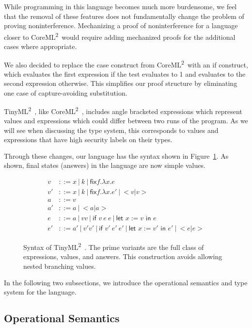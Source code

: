 \documentclass[a4paper,twocolumn]{article}
\newcommand{\langName}[0]{TinyML\textsuperscript{2}~}
\newcommand{\origLang}[0]{CoreML\textsuperscript{2}~}
\theoremstyle{plain}
\theoremstyle{definition}
\begin{document}
While programming in this language becomes much more burdensome, we
feel that the removal of these features does not fundamentally 
change the problem of proving
noninterference.  Mechanizing a proof of noninterference for a
language closer to \origLang would require adding mechanized proofs
for the additional cases where appropriate.

We also decided to replace the
\textsf{case} construct from \origLang with an \textsf{if} construct, which
evaluates the first expression if the test evaluates to 1 and evaluates to the
second expression otherwise.  This simplifies our proof structure by eliminating
one case of capture-avoiding substitution.

\langName, like \origLang, includes angle bracketed expressions which represent
values and expressions which could differ between two runs of the program.  As we
will see when discussing the type system, this corresponds to values and
expressions that have high security labels on their types.

Through these changes, our language has the syntax shown in
Figure~\ref{fig:syntax}.  As shown, final states (answers) in the language are
now simple values.

\begin{figure}[t]
  \begin{align}
    v & ::= x \: | \: k \: | \: \textsf{fix} f . \lambda x . e \tag*{ } \\
    v' & ::= x \: | \: k \: | \: \textsf{fix} f . \lambda x . e' \: | \: <v | v> \tag{values}\\
    a & ::= v \tag*{ } \\
    a' & ::= a \: | \: <a | a> \tag{answers} \\
    e & ::= a \: | \: v v \: | \: \textsf{if } v \: e \: e \: | \: \textsf{let
    } x := v \textsf{ in } e \tag*{ } \\
    e' & ::= a' \: | \: v' v' \: | \: \textsf{if } v' \: e' \: e' \: | \:
    \textsf{let } x := v' \textsf{ in } e' \: | \: <e | e> \tag{expressions}
  \end{align}
  \caption{Syntax of \langName.  The prime variants are the full class of
  expressions, values, and answers.  This construction avoids allowing nested
  branching values.}
  \label{fig:syntax}
\end{figure}

In the following two subsections, we introduce the operational semantics and
type system for the language.

\subsection{Operational Semantics}
\end{document}
